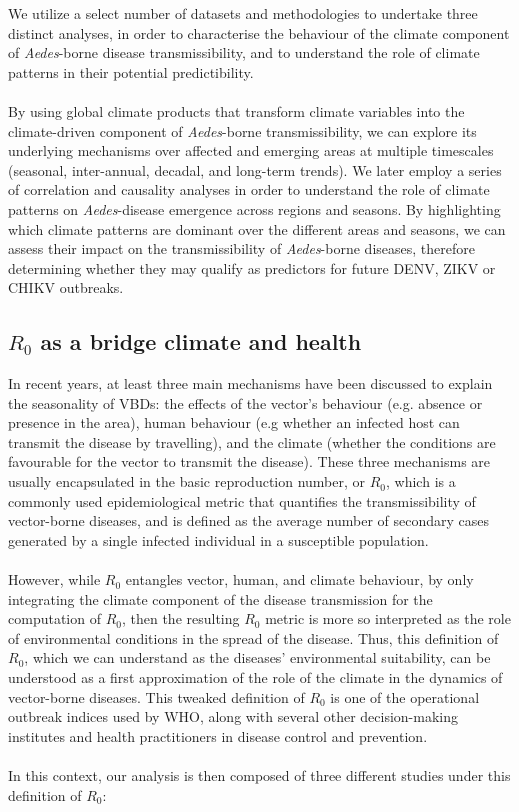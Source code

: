 \documentclass[10pt,twocolumn]{wlscirep}
\begin{document}
We utilize a select number of datasets and methodologies to undertake three distinct analyses, in order to characterise the behaviour of the climate component of \textit{Aedes}-borne disease transmissibility, and to understand the role of climate patterns in their potential predictibility.
\\
\\
By using global climate products that transform climate variables into the climate-driven component of \textit{Aedes}-borne transmissibility, we can explore its underlying mechanisms over affected and emerging areas at multiple timescales (seasonal, inter-annual, decadal, and long-term trends). We later employ a series of correlation and causality analyses in order to understand the role of climate patterns on \textit{Aedes}-disease emergence across regions and seasons. By highlighting which climate patterns are dominant over the different areas and seasons, we can assess their impact on the transmissibility of \textit{Aedes}-borne diseases, therefore determining whether they may qualify as predictors for future DENV, ZIKV or CHIKV outbreaks.

\subsection{$R_0$ as a bridge climate and health} \label{sec-methods-redefining-R0}

In recent years, at least three main mechanisms have been discussed to explain the seasonality of VBDs\cite{moriyama_2020}: the effects of the vector's behaviour (e.g. absence or presence in the area), human behaviour (e.g whether an infected host can transmit the disease by travelling), and the climate (whether the conditions are favourable for the vector to transmit the disease). These three mechanisms are usually encapsulated in the basic reproduction number, or $R_0$, which is a commonly used epidemiological metric that quantifies the transmissibility of vector-borne diseases, and is defined as the average number of secondary cases generated by a single infected individual in a susceptible population\cite{dietz_1993}.
\\
\\
However, while $R_0$ entangles vector, human, and climate behaviour, by only integrating the climate component of the disease transmission for the computation of $R_0$, then the resulting $R_0$ metric is more so interpreted as the role of environmental conditions in the spread of the disease. Thus, this definition of $R_0$, which we can understand as the diseases' environmental suitability, can be understood as a first approximation of the role of the climate in the dynamics of vector-borne diseases. This tweaked definition of $R_0$ is one of the operational outbreak indices used by WHO, along with several other decision-making institutes and health practitioners in disease control and prevention\cite{OMS_2017, chiew_2014}.
\\
\\
In this context, our analysis is then composed of three different studies under this definition of $R_0$:
\end{document}
